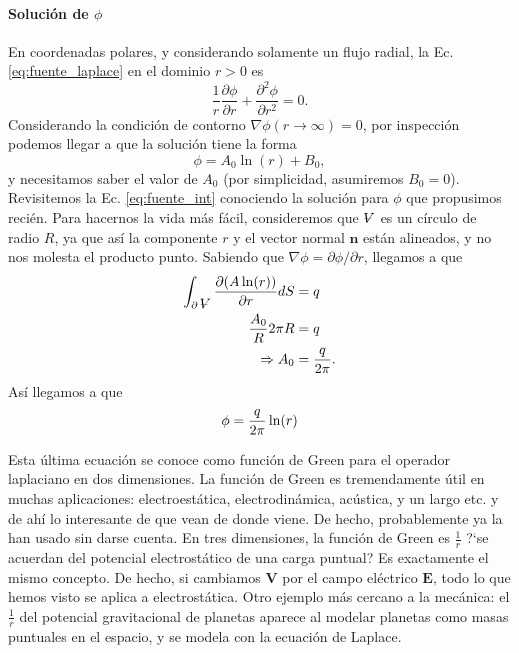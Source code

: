 \paragraph{Solución de $\phi$}
En coordenadas polares, y considerando solamente un flujo radial, la Ec. \eqref{eq:fuente_laplace} en el dominio $r>0$ es
%
\begin{equation}
\frac{1}{r}\frac{\partial\phi}{\partial r} + \frac{\partial^2\phi}{\partial r^2} = 0.
\end{equation}
%
Considerando la condición de contorno $\nabla\phi(r\to\infty)=0$, por inspección podemos llegar a que la solución tiene la forma 
%
\begin{equation}
\phi = A_0\ln(r) + B_0,
\end{equation}
%
y necesitamos saber el valor de $A_0$ (por simplicidad, asumiremos $B_0=0$).
Revisitemos la Ec. \eqref{eq:fuente_int} conociendo la solución para $\phi$ que propusimos recién.
Para hacernos la vida más fácil, consideremos que $\vol$ es un círculo de radio $R$, ya que así la componente $r$ y el vector normal $\mathbf{n}$ están alineados, y no nos molesta el producto punto.
Sabiendo que $\nabla\phi=\partial\phi/\partial r$, llegamos a que
%
\begin{align}
\int_{\partial\vol}\frac{\partial(A\ln(r))}{\partial{r}}dS &= q\nonumber\\
\frac{A_0}{R}2\pi R&= q\nonumber\\
\Rightarrow A_0 &= \frac{q}{2\pi}.
\end{align}
%
Así llegamos a que
\begin{equation}
\phi=\frac{q}{2\pi}\ln(r)\nonumber\\
\end{equation}

Esta última ecuación se conoce como función de Green para el operador laplaciano en dos dimensiones. 
La función de Green es tremendamente útil en muchas aplicaciones: electroestática, electrodinámica, acústica, y un largo etc. y de ahí lo interesante de que vean de donde viene.
De hecho, probablemente ya la han usado sin darse cuenta.
En tres dimensiones, la función de Green es $\frac{1}{r}$ \mbox{?`}se acuerdan del potencial electrostático de una carga puntual? Es exactamente el mismo concepto.
De hecho, si cambiamos $\mathbf{V}$ por el campo eléctrico $\mathbf{E}$, todo lo que hemos visto se aplica a electrostática.
Otro ejemplo más cercano a la mecánica: el $\frac{1}{r}$ del potencial gravitacional de planetas aparece al modelar planetas como masas puntuales en el espacio, y se modela con la ecuación de Laplace.

